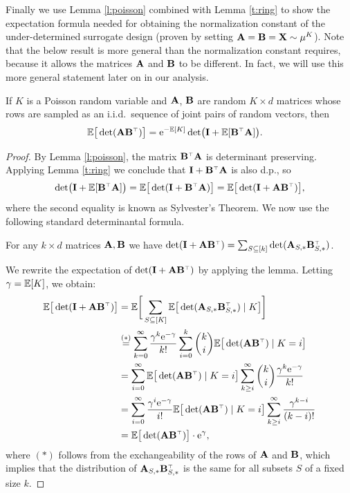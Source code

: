 \documentclass[11pt]{article}
\begin{document}
Finally we use Lemma \ref{l:poisson} combined with Lemma
\ref{t:ring} to show the expectation formula needed for obtaining the
normalization constant of the under-determined surrogate
design (proven by setting $\mathbf A=\mathbf B=\mathbf X\sim\mu^K$). Note that the below result is
more general than the normalization constant requires, because it allows the matrices
$\mathbf A$ and $\mathbf B$ to be different. In fact, we will use this more general
statement later on in our analysis.
\begin{lemma}\label{l:normalization}
If $K$ is a Poisson random variable and $\mathbf A$, $\mathbf B$ are random $K\times d$
matrices whose rows  are sampled as an i.i.d.~sequence of joint pairs of
random vectors, then
\begin{align*}
  \E\big[\det(\A\B^\top)\big] &= \ee^{-\E[K]}\det\!\big(\I + \E[\B^\top\A]\big).
  \end{align*}
\end{lemma}
\begin{proof}
By Lemma \ref{l:poisson}, the matrix $\B^\top\A$ is determinant
preserving. Applying Lemma \ref{t:ring} we conclude that
$\I+\B^\top\A$ is also d.p., so
\begin{align*}
  \det\!\big(\I+\E[\B^\top\A]\big) = \E\big[\det(\I+\B^\top\A)\big] =\E\big[\det(\I+\A\B^\top)\big],
\end{align*}
where the second equality is known as Sylvester's Theorem.
We now use the following standard determinantal formula.
\begin{lemma}
  For any $k\times d$ matrices $\mathbf A,\mathbf B$ we have
  $\det(\I+\A\B^\top)=\sum_{S\subseteq[k]}\det(\A_{S,*}\B_{S,*}^\top)$.
\end{lemma}
We rewrite the expectation of $\det(\I+\A\B^\top)$ by applying the
lemma.  Letting $\gamma=\mathbb E[K]$, we obtain:
\begin{align*}
\E\big[\det(\I+\A\B^\top)\big]  &=\E\bigg[\sum_{S\subseteq [K]}\E\big[\det(\A_{S,*}\B_{S,*}^\top)\mid
    K\big]\bigg]\\
  &\overset{(*)}{=}\sum_{k=0}^\infty\frac{\gamma^k\ee^{-\gamma}}{k!} \sum_{i=0}^k{k\choose
    i}\E\big[\det(\A\B^\top)\mid K=i\big]\\
  &=\sum_{i=0}^\infty \E\big[\det(\A\B^\top)\mid K=i\big]\sum_{k\geq
    i}^\infty{k\choose i}\frac{\gamma^k\ee^{-\gamma}}{k!}\\
  &=\sum_{i=0}^\infty
    \frac{\gamma^i\ee^{-\gamma}}{i!}\E\big[\det(\A\B^\top)\mid K=i\big]
    \sum_{k\geq i}^\infty\frac{\gamma^{k-i}}{(k-i)!} \\
  &= \E\big[\det(\A\B^\top)\big]\cdot\ee^\gamma,
\end{align*}
where $(*)$ follows from the exchangeability of the rows of $\mathbf A$ and
$\mathbf B$, which implies that the distribution of $\A_{S,*}\B_{S,*}^\top$ is the
same for all subsets $S$ of a fixed size $k$.
\end{proof}
\end{document}

